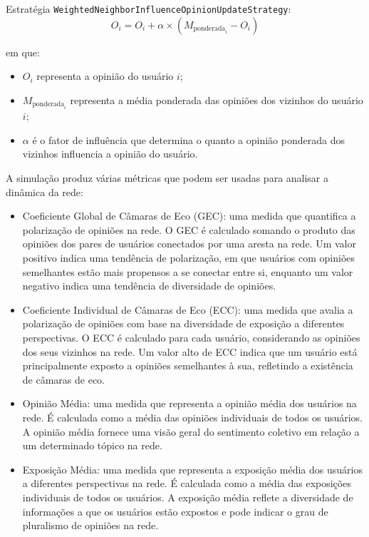 Estratégia \texttt{WeightedNeighborInfluenceOpinionUpdateStrategy}:
\begin{equation*}
	O_i = O_i + \alpha \times (M_{\text{ponderada}_i} - O_i)
\end{equation*}

em que:

\begin{itemize}
	\item $O_i$ representa a opinião do usuário $i$;
	\item $M_{\text{ponderada}_i}$ representa a média ponderada das opiniões dos vizinhos do usuário $i$;
	\item $\alpha$ é o fator de influência que determina o quanto a opinião ponderada dos vizinhos influencia a opinião do usuário.
\end{itemize}

A simulação produz várias métricas que podem ser usadas para analisar a dinâmica da rede:

\begin{itemize}
	\item Coeficiente Global de Câmaras de Eco (GEC): uma medida que quantifica a polarização de opiniões na rede. O GEC é calculado somando o produto das opiniões dos pares de usuários conectados por uma aresta na rede. Um valor positivo indica uma tendência de polarização, em que usuários com opiniões semelhantes estão mais propensos a se conectar entre si, enquanto um valor negativo indica uma tendência de diversidade de opiniões.
	\item Coeficiente Individual de Câmaras de Eco (ECC): uma medida que avalia a polarização de opiniões com base na diversidade de exposição a diferentes perspectivas. O ECC é calculado para cada usuário, considerando as opiniões dos seus vizinhos na rede. Um valor alto de ECC indica que um usuário está principalmente exposto a opiniões semelhantes à sua, refletindo a existência de câmaras de eco.
	\item Opinião Média: uma medida que representa a opinião média dos usuários na rede. É calculada como a média das opiniões individuais de todos os usuários. A opinião média fornece uma visão geral do sentimento coletivo em relação a um determinado tópico na rede.
	\item Exposição Média: uma medida que representa a exposição média dos usuários a diferentes perspectivas na rede. É calculada como a média das exposições individuais de todos os usuários. A exposição média reflete a diversidade de informações a que os usuários estão expostos e pode indicar o grau de pluralismo de opiniões na rede.
\end{itemize}

